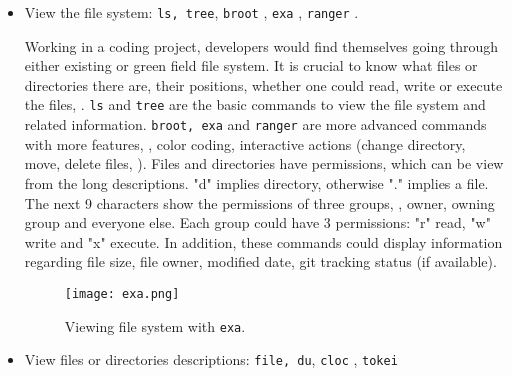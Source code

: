 \begin{itemize}
	\setlength\itemsep{0em}
	\item View the file system: \verb|ls, tree|, \texttt{broot} \cite{broot}, \texttt{exa} \cite{exa}, \texttt{ranger} \cite{ranger}.
	
	Working in a coding project, developers would find themselves going through either existing or green field file system. It is crucial to know what files or directories there are, their positions, whether one could read, write or execute the files, \etc. \texttt{ls} and \texttt{tree} are the basic commands to view the file system and related information. \texttt{broot, exa} and \texttt{ranger} are more advanced commands with more features, \eg, color coding, interactive actions (change directory, move, delete files, \etc). Files and directories have permissions, which can be view from the long descriptions. "d" implies directory, otherwise "." implies a file. The next 9 characters show the permissions of three groups, \ie, owner, owning group and everyone else. Each group could have 3 permissions: "r" read, "w" write and "x" execute. In addition, these commands could display information regarding file size, file owner, modified date, git tracking status (if available).
	\begin{figure}[hbt!]
		\centering
		\texttt{[image: exa.png]}
		\caption{Viewing file system with \texttt{exa}.}
	\end{figure}

	\item View files or directories descriptions: \verb|file, du|, \verb|cloc| \cite{cloc}, \verb|tokei| \cite{tokei}
	

\end{itemize}
